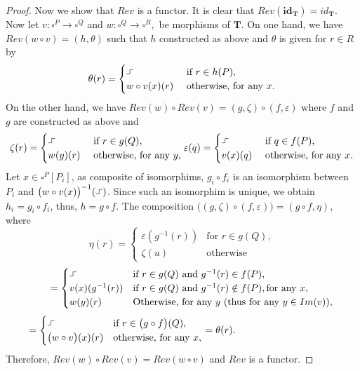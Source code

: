 \documentclass[11pt,a4paper,oldfontcommands]{memoir}
\newcommand{\TrO}{\mathbf{T}}
\newcommand*\exec{%
  \raisebox{1pt}{%
    \begin{tikzpicture}[x=.8ex,y=1ex,-]
      \draw (0,0) -- (1,0) -- (1,1) -- (2,1);
    \end{tikzpicture}}}
\begin{document}
\begin{proof}
Now we show that $Rev$ is a functor. It is clear that $Rev(\mathbf{id}_{\TrO})=id_{\TrO}$. Now let $v: \square^P \to \square^Q$ and $w: \square^Q \to \square^R,$ be morphisms of $\TrO$. On one hand, we have $Rev(w \circ v)= (h,\theta)$ such that $h$ constructed as above and $\theta$ is given for $r \in R$ by
  $$\theta(r)= \begin{cases} \exec &   \text { if } r\in h(P), \\ w \circ v (x)(r) & \text { otherwise, for any } x. \end{cases}
$$
On the other hand, we have $Rev(w) \circ Rev(v)=(g, \zeta)\circ (f,\varepsilon)$ where $f$ and $g$ are constructed as above and 
\begin{equation*}
    \zeta(r)= \begin{cases} \exec &   \text { if } r\in g(Q), \\ w(y)(r) & \text { otherwise, for any } y, \end{cases}
   \varepsilon(q)= \begin{cases} \exec &   \text { if } q\in f(P), \\ v(x)(q) & \text { otherwise, for any } x. \end{cases}
\end{equation*}
Let $x \in \square^P[P_i]$, as composite of isomorphims, $g_i \circ f_i$ is an isomorphism between $P_i$ and $\bigl(w\circ v(x)\bigl)^{-1}(\exec)$. Since such an isomorphim is unique, we obtain $h_i=g_i \circ f_i$, thus, $h=g \circ f$. The composition 
$\bigl( (g,\zeta) \circ (f,\varepsilon) \bigl)=(g\circ f,\eta)$, where
    \begin{equation*}
      \eta(r)=
      \begin{cases}
        \varepsilon(g^{-1}(r)) & \text{for $r\in g(Q)$}, \\
        \zeta(u) & \text{otherwise}
      \end{cases}
        \end{equation*}
          \begin{equation*}
  \hspace{.7cm}    =    \begin{cases}
        \exec & \text{if $r\in g(Q)$ and $g^{-1}(r) \in f(P)$}, \\   v(x)(g^{-1}(r)) & \text{if $r\in g(Q)$ and $g^{-1}(r) \notin f(P)$}, \text{for any } x, \\    w(y)(r) & \text{Otherwise, for any } y \text{ (thus for any $y \in Im(v)$)},
      \end{cases}
    \end{equation*}
\begin{equation*}
   \hspace{.7cm}         =    \begin{cases}
        \exec & \text{if $r\in \bigl(g\circ f \bigl)(Q)$}, \\  \bigl(w \circ v\bigl)(x)(r) & \text{otherwise, for any } x,
      \end{cases}=\theta(r).
      \hspace{4.3cm}
\end{equation*}
Therefore, $Rev(w) \circ Rev(v)=Rev(w \circ v)$ and $Rev$ is a functor.


\end{proof}
\end{document}
